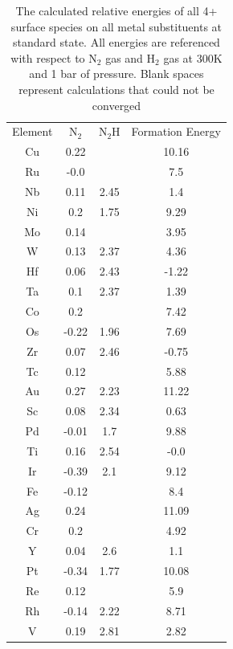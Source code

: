 \begin{table}
\begin{center}
\begin{tabular}{| c | c | c | c |}
\hline
Element & N$_2$ & N$_2$H & Formation Energy \\
Cu & 0.22 &  & 10.16 \\
Ru & -0.0 &  & 7.5 \\
Nb & 0.11 & 2.45 & 1.4 \\
Ni & 0.2 & 1.75 & 9.29 \\
Mo & 0.14 &  & 3.95 \\
W & 0.13 & 2.37 & 4.36 \\
Hf & 0.06 & 2.43 & -1.22 \\
Ta & 0.1 & 2.37 & 1.39 \\
Co & 0.2 &  & 7.42 \\
Os & -0.22 & 1.96 & 7.69 \\
Zr & 0.07 & 2.46 & -0.75 \\
Tc & 0.12 &  & 5.88 \\
Au & 0.27 & 2.23 & 11.22 \\
Sc & 0.08 & 2.34 & 0.63 \\
Pd & -0.01 & 1.7 & 9.88 \\
Ti & 0.16 & 2.54 & -0.0 \\
Ir & -0.39 & 2.1 & 9.12 \\
Fe & -0.12 &  & 8.4 \\
Ag & 0.24 &  & 11.09 \\
Cr & 0.2 &  & 4.92 \\
Y & 0.04 & 2.6 & 1.1 \\
Pt & -0.34 & 1.77 & 10.08 \\
Re & 0.12 &  & 5.9 \\
Rh & -0.14 & 2.22 & 8.71 \\
V & 0.19 & 2.81 & 2.82 \\
\hline
\end{tabular}
\end{center}
\caption{The calculated relative energies of all 4+ surface species on all metal substituents at standard state. All energies are referenced with respect to N$_2$ gas and H$_2$ gas at 300K and 1 bar of pressure. Blank spaces represent calculations that could not be converged}
\hline
\end{table}

